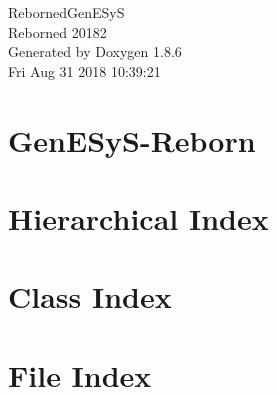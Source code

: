 \documentclass[twoside]{book}
\newcommand{\clearemptydoublepage}{%
  \newpage{\pagestyle{empty}\cleardoublepage}%
}
\begin{document}
\hypersetup{pageanchor=false}
\begin{titlepage}
\vspace*{7cm}
\begin{center}%
{\Large Reborned\-Gen\-E\-Sy\-S \\[1ex]\large Reborned 20182 }\\
\vspace*{1cm}
{\large Generated by Doxygen 1.8.6}\\
\vspace*{0.5cm}
{\small Fri Aug 31 2018 10:39:21}\\
\end{center}
\end{titlepage}
\clearemptydoublepage
\tableofcontents
\clearemptydoublepage
{}
\hypersetup{pageanchor=true}

\chapter{Gen\-E\-Sy\-S-\/\-Reborn}
\label{md__r_e_a_d_m_e}
\hypertarget{md__r_e_a_d_m_e}{}

\chapter{Hierarchical Index}

\chapter{Class Index}

\chapter{File Index}

\end{document}

